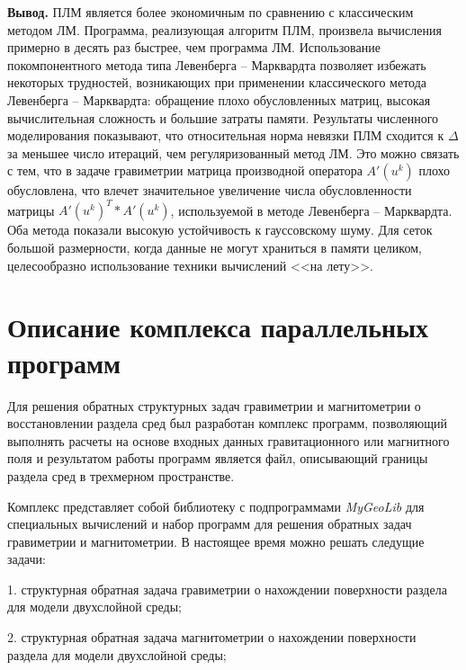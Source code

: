 {\bfseries\large Вывод.} ПЛМ является более экономичным по сравнению с классическим методом ЛМ. Программа, реализующая алгоритм ПЛМ, произвела вычисления примерно в десять раз быстрее, чем программа ЛМ. %
Использование покомпонентного метода типа Левенберга -- Марквардта позволяет избежать некоторых трудностей, возникающих при применении классического метода Левенберга -- Марквардта: обращение плохо обусловленных матриц, высокая вычислительная сложность и большие затраты памяти. Результаты численного моделирования показывают, что относительная норма невязки ПЛМ сходится к $\Delta$ за меньшее число итераций, чем регуляризованный метод ЛМ. Это можно связать с тем, что в задаче гравиметрии матрица производной оператора $A'(u^k)$ плохо обусловлена, что влечет значительное увеличение числа обусловленности матрицы $A'(u^k)^T*A'(u^k)$, используемой в методе Левенберга -- Марквардта. Оба метода показали высокую устойчивость к гауссовскому шуму. Для сеток большой размерности, когда данные не могут храниться в памяти целиком, целесообразно использование техники вычислений <<на лету>>.

\newpage
\section{Описание комплекса параллельных программ}

Для решения обратных структурных задач гравиметрии и магнитометрии о восстановлении раздела сред был разработан комплекс программ, позволяющий выполнять расчеты на основе входных данных гравитационного или магнитного поля и результатом работы программ является файл, описывающий границы раздела сред в трехмерном пространстве.

Комплекс представляет собой библиотеку с подпрограммами \textit{MyGeoLib} для специальных вычислений и набор программ для решения обратных задач гравиметрии и магнитометрии. В настоящее время можно решать следущие задачи:

1. структурная обратная задача гравиметрии о нахождении поверхности раздела для модели двухслойной среды;

2. структурная обратная задача магнитометрии о нахождении поверхности раздела для модели двухслойной среды;

